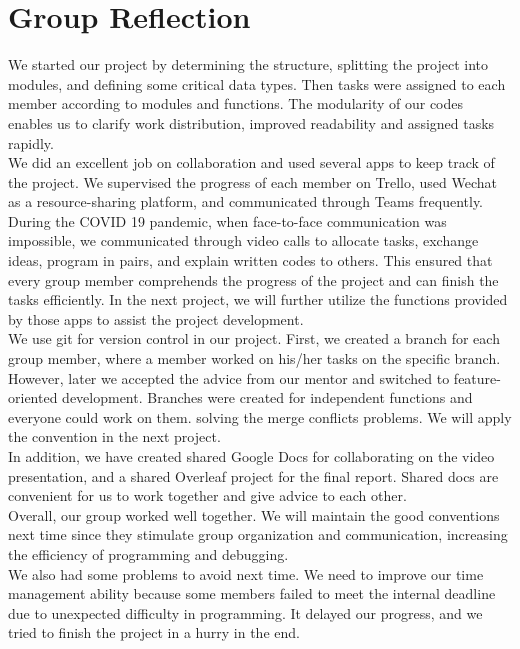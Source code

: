 \documentclass{article}
\begin{document}
\section{Group Reflection}
    We started our project by determining the structure, splitting the project into modules, and defining some critical data types. Then tasks were assigned to each member according to modules and functions. The modularity of our codes enables us to clarify work distribution, improved readability and assigned tasks rapidly.\\
    We did an excellent job on collaboration and used several apps to keep track of the project.  We supervised the progress of each member on Trello, used Wechat as a resource-sharing platform, and communicated through Teams frequently. During the COVID 19 pandemic, when face-to-face communication was impossible, we communicated through video calls to allocate tasks, exchange ideas, program in pairs, and explain written codes to others. This ensured that every group member comprehends the progress of the project and can finish the tasks efficiently. In the next project, we will further utilize the functions provided by those apps to assist the project development. \\
    We use git for version control in our project. First, we created a branch for each group member, where a member worked on his/her tasks on the specific branch. However, later we accepted the advice from our mentor and switched to feature-oriented development. Branches were created for independent functions and everyone could work on them. solving the merge conflicts problems. We will apply the convention in the next project. \\
    In addition, we have created shared Google Docs for collaborating on the video presentation, and a shared Overleaf project for the final report. Shared docs are convenient for us to work together and give advice to each other.\\
    Overall, our group worked well together. We will maintain the good conventions next time since they stimulate group organization and communication, increasing the efficiency of programming and debugging.\\
    We also had some problems to avoid next time. We need to improve our time management ability because some members failed to meet the internal deadline due to unexpected difficulty in programming. It delayed our progress, and we tried to finish the project in a hurry in the end. 
\end{document}
